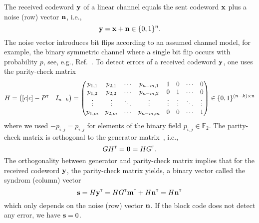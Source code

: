 The received codeword $\vb{y}$ of a linear channel equals the sent codeword $\vb{x}$ plus a noise (row) vector $\vb{n}$, i.e.,
\begin{equation}
	\vb{y}
	=
	\vb{x}
	+
	\vb{n}
	\in\{0,1\}^n
	.
\end{equation}
The noise vector introduces bit flips according to an assumed channel model, for example, the binary symmetric channel where a single bit flip occurs with probability $p$, see, e.g., Ref.~\cite[p.~148]{MacKay2003}.
To detect errors of a received codeword $\vb{y}$, one uses the parity-check matrix
\begin{equation}
	H
	=
	\begin{pmatrix}[c|c]
		-P^{\scriptscriptstyle\mathsf{T}} & I_{n-k}
	\end{pmatrix}
	=
	\begin{pmatrix}
		p_{1,1} & p_{2,1} & \cdots & p_{n-m,1} & 1 & 0 & \cdots & 0 \\
		p_{1,2} & p_{2,2} & \cdots & p_{n-m,2} & 0 & 1 & \cdots & 0 \\
		\vdots & \vdots & \ddots & \vdots & \vdots & \vdots & \ddots & \vdots \\
		p_{1,m} & p_{2,m} & \cdots & p_{n-m,m} & 0 & 0 & \cdots & 1 \\
	\end{pmatrix}
	\in\{0,1\}^{(n-k)\times n}
\end{equation}
where we used $-p_{i,j}=p_{i,j}$ for elements of the binary field $p_{i,j}\in\mathbb{F}_2$.
The parity-check matrix is orthogonal to the generator matrix~\cite[p.~95]{Mildenberger2013}, i.e.,
\begin{equation}
	GH^{\scriptscriptstyle\mathsf{T}}
	=
	\vb{0}
	=
	HG^{\scriptscriptstyle\mathsf{T}}
	.
\end{equation}
The orthogonality between generator and parity-check matrix implies that for the received codeword $\vb{y}$, the parity-check matrix yields, a binary vector called the syndrom (column) vector
\begin{equation}
	\vb{s}
	=
	H\vb{y}^{\scriptscriptstyle\mathsf{T}}
	=
	HG^{\scriptscriptstyle\mathsf{T}}\vb{m}^{\scriptscriptstyle\mathsf{T}}
	+
	H\vb{n}^{\scriptscriptstyle\mathsf{T}}
	=
	H\vb{n}^{\scriptscriptstyle\mathsf{T}}
\end{equation}
which only depends on the noise (row) vector $\vb{n}$.
If the block code does not detect any error, we have $\vb{s}=0$.
